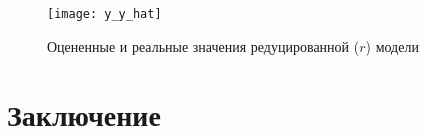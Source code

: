 \documentclass[12pt, a4paper]{article}
\begin{document}
\begin{figure}[h!]
	\centering
	\texttt{[image: y\_y\_hat]}
	\caption{Оцененные и реальные значения редуцированной ($r$) модели}
	\label{fig:y_y_hat_reduced}
\end{figure}

\section*{Заключение}


\clearpage



\end{document}
